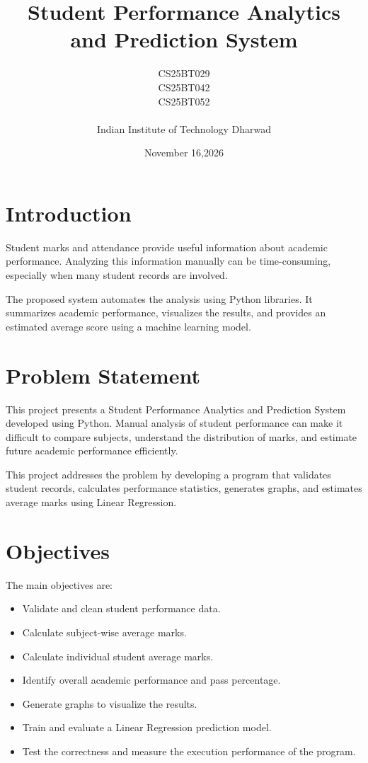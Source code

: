 \documentclass[12pt,a4paper]{article}
\title{\textbf{Student Performance Analytics and Prediction System}}
\author{
CS25BT029 \\
CS25BT042 \\
CS25BT052 \\
\\
Indian Institute of Technology Dharwad
}
\date{November 16,2026}
\begin{document}
\maketitle

\section{Introduction}

Student marks and attendance provide useful information about
academic performance. Analyzing this information manually can
be time-consuming, especially when many student records are
involved.

The proposed system automates the analysis using Python libraries.
It summarizes academic performance, visualizes the results,
and provides an estimated average score using a machine learning
model.

\section{Problem Statement}

This project presents a Student Performance Analytics and
Prediction System developed using Python. Manual analysis of student performance can make it difficult
to compare subjects, understand the distribution of marks,
and estimate future academic performance efficiently.

This project addresses the problem by developing a program
that validates student records, calculates performance
statistics, generates graphs, and estimates average marks
using Linear Regression.

\section{Objectives}

The main objectives are:

\begin{itemize}
    \item Validate and clean student performance data.
    \item Calculate subject-wise average marks.
    \item Calculate individual student average marks.
    \item Identify overall academic performance and pass percentage.
    \item Generate graphs to visualize the results.
    \item Train and evaluate a Linear Regression prediction model.
    \item Test the correctness and measure the execution performance
    of the program.
\end{itemize}
\end{document}
